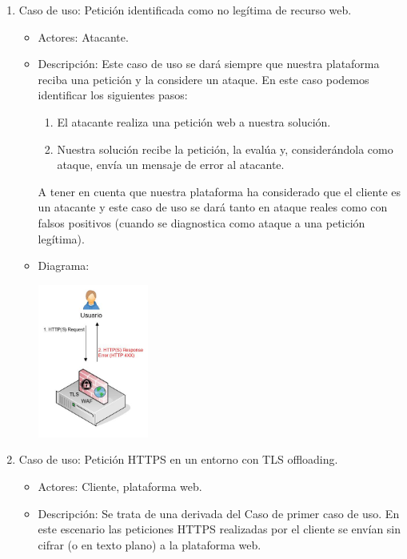 \begin{enumerate}
\begin{itemize}
\begin{center}
        \end{center}
    \end{itemize}
\clearpage
  \item Caso de uso: Petición identificada como no legítima de recurso web.
    \begin{itemize}
      \item Actores: \Gls{Atacante}.
      \item Descripción: Este caso de uso se dará siempre que nuestra plataforma reciba una petición y la considere un ataque. En este caso podemos identificar los siguientes pasos:
        \begin{enumerate}
          \item El atacante realiza una petición web a nuestra solución.
          \item Nuestra solución recibe la petición, la evalúa y, considerándola como ataque, envía un mensaje de error al atacante.
        \end{enumerate}
        \par A tener en cuenta que nuestra plataforma ha considerado que el cliente es un atacante y este caso de uso se dará tanto en ataque reales como con falsos positivos (cuando se diagnostica como ataque a una
        petición legítima).
      \item Diagrama:
        \begin{center}
          \label{fig:CasoUso2}
          \includegraphics[width=0.3\textwidth]{fig/UseCase2}
        \end{center}
    \end{itemize}
\clearpage
  \item Caso de uso: Petición HTTPS en un entorno con TLS offloading.
    \begin{itemize}
      \item Actores: Cliente, plataforma web.
      \item Descripción: Se trata de una derivada del Caso de primer caso de uso. En este escenario las peticiones HTTPS realizadas por el cliente se envían sin cifrar (o en texto plano) a la plataforma web.

\end{itemize}
\end{enumerate}
